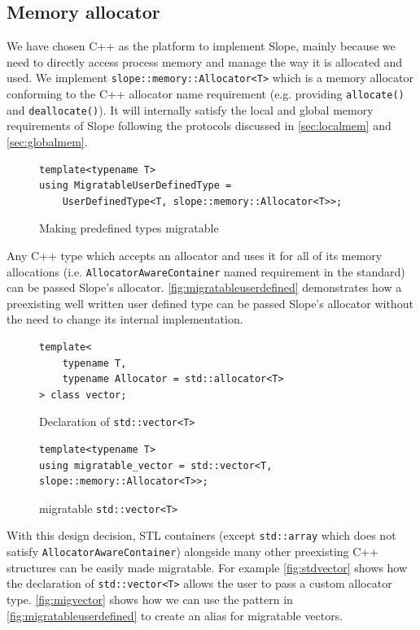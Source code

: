 \subsection{Memory allocator}
\label{sec:platform}
We have chosen C++ as the platform to implement Slope, mainly because we need
to directly access process memory and manage the way it is allocated and used.
We implement \texttt{slope::memory::Allocator<T>} which is a memory allocator
conforming to the C++ allocator name requirement (e.g. providing
\texttt{allocate()} and \texttt{deallocate()}). It will internally satisfy the
local and global memory requirements of Slope following the protocols discussed
in \autoref{sec:localmem} and \autoref{sec:globalmem}.

\begin{figure}[t]
\begin{lstlisting}
template<typename T>
using MigratableUserDefinedType =
    UserDefinedType<T, slope::memory::Allocator<T>>;
\end{lstlisting}
\caption{
    Making predefined types migratable
}
\label{fig:migratableuserdefined}
\end{figure}

Any C++ type which accepts an allocator and uses it for all of its memory
allocations (i.e. \texttt{AllocatorAwareContainer} named requirement in the standard)
can be passed Slope's allocator. \autoref{fig:migratableuserdefined}
demonstrates how a preexisting well written user defined type can be
passed Slope's allocator without the need to change its internal implementation.

\begin{figure}[t]
\begin{lstlisting}
template<
    typename T,
    typename Allocator = std::allocator<T>
> class vector;
\end{lstlisting}
\caption{
    Declaration of \texttt{std::vector<T>}
}
\label{fig:stdvector}
\end{figure}


\begin{figure}[t]
\begin{lstlisting}
template<typename T>
using migratable_vector = std::vector<T, slope::memory::Allocator<T>>;

\end{lstlisting}
\caption{
    migratable \texttt{std::vector<T>}
}
\label{fig:migvector}
\end{figure}


With this design decision, STL containers (except \texttt{std::array} which
does not satisfy \texttt{AllocatorAwareContainer}) alongside many other preexisting
C++ structures can be easily made migratable.
For example \autoref{fig:stdvector} shows how the declaration of
\texttt{std::vector<T>}
allows the user to pass a custom allocator type. \autoref{fig:migvector} shows
how we can use the pattern in \autoref{fig:migratableuserdefined} to create
an alias for migratable vectors.



